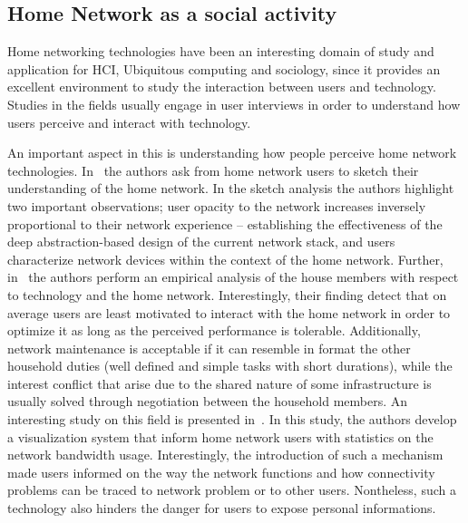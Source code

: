 \subsection{Home Network as a social activity}

Home networking technologies have been an interesting domain of study and
application for HCI, Ubiquitous computing and sociology, since it
provides an excellent environment to study the interaction between users and
technology. Studies in the fields usually engage in user interviews in order to
understand how users perceive and interact with technology. 

An important aspect in this is understanding how people perceive home network
technologies.
In~\cite{shehanpoole08:_desig_inter_home_networ_maint_tools,grinter05:_work_make_home_networ_work}
the authors ask from home network users to sketch their understanding of the
home network. In the sketch analysis the authors highlight two important
observations; user opacity to the network increases inversely proportional to
their network experience -- establishing  the effectiveness of the deep
abstraction-based design of the current network stack, and users characterize
network devices within the context of the home network. Further,
in~\cite{tolmie07:_makin} the authors perform an empirical analysis of the house
members with respect to technology and the home network.  Interestingly, their
finding detect that on average users are least motivated to interact with the
home network in order to optimize it as long as the perceived performance is
tolerable. Additionally, network maintenance is acceptable if it can resemble in
format the other household duties (well defined and simple tasks with short
durations), while the interest conflict that arise due to the shared nature of
some infrastructure is usually solved through negotiation between the household
members. An interesting study on this field is presented in~\cite{Chetty10}. In
this study, the authors develop a visualization system that inform home network
users with statistics on the network bandwidth usage. Interestingly, the
introduction of such a mechanism made users informed on the way the network
functions and how connectivity problems can be traced to network problem or to
other users.  Nontheless, such a technology also hinders the danger for users to
expose personal informations. 

